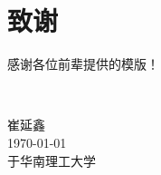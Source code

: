 \chapter{致\texorpdfstring{\quad}{}谢}
感谢各位前辈提供的模版！


~\\

\begin{minipage}[t]{0.945\textwidth}%
	\begin{flushright}
		崔延鑫\\
		\today\\	%
		于华南理工大学
		\par\end{flushright}
\end{minipage}

